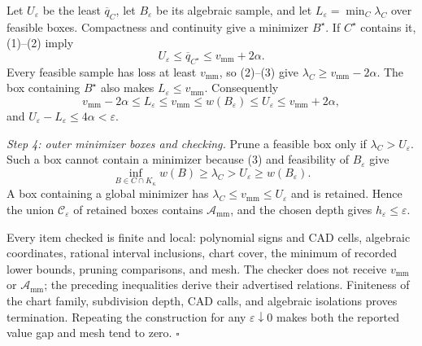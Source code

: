 Let \(U_\varepsilon\) be the least \(\overline q_C\), let \(B_\varepsilon\) be its algebraic sample, and let \(L_\varepsilon=\min_C\lambda_C\) over feasible boxes.  Compactness and continuity give a minimizer \(B^\star\).  If \(C^\star\) contains it, (1)--(2) imply
\[
 U_\varepsilon\le\overline q_{C^\star}
 \le v_{\mathrm{mm}}+2\alpha.
\]
Every feasible sample has loss at least \(v_{\mathrm{mm}}\), so (2)--(3) give \(\lambda_C\ge v_{\mathrm{mm}}-2\alpha\).  The box containing \(B^\star\) also makes \(L_\varepsilon\le v_{\mathrm{mm}}\).  Consequently
\[
 v_{\mathrm{mm}}-2\alpha
 \le L_\varepsilon\le v_{\mathrm{mm}}
 \le w(B_\varepsilon)\le U_\varepsilon
 \le v_{\mathrm{mm}}+2\alpha,
\]
and \(U_\varepsilon-L_\varepsilon\le4\alpha<\varepsilon\).

\emph{Step 4: outer minimizer boxes and checking.}
Prune a feasible box only if \(\lambda_C>U_\varepsilon\).  Such a box cannot contain a minimizer because (3) and feasibility of \(B_\varepsilon\) give
\[
 \inf_{B\in C\cap K_\kappa}w(B)
 \ge\lambda_C>U_\varepsilon\ge w(B_\varepsilon).
\]
A box containing a global minimizer has \(\lambda_C\le v_{\mathrm{mm}}\le U_\varepsilon\) and is retained.  Hence the union \(\mathcal C_\varepsilon\) of retained boxes contains \(\mathcal A_{\mathrm{mm}}\), and the chosen depth gives \(h_\varepsilon\le\varepsilon\).

Every item checked is finite and local: polynomial signs and CAD cells, algebraic coordinates, rational interval inclusions, chart cover, the minimum of recorded lower bounds, pruning comparisons, and mesh.  The checker does not receive \(v_{\mathrm{mm}}\) or \(\mathcal A_{\mathrm{mm}}\); the preceding inequalities derive their advertised relations.  Finiteness of the chart family, subdivision depth, CAD calls, and algebraic isolations proves termination.  Repeating the construction for any \(\varepsilon\downarrow0\) makes both the reported value gap and mesh tend to zero. \(\square\)